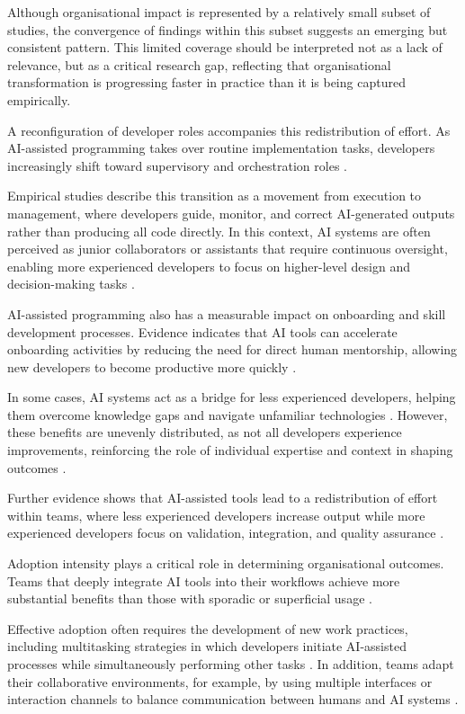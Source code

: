 \documentclass[conference]{IEEEtran}
\begin{document}
Although organisational impact is represented by a relatively small subset of studies, the convergence of findings within this subset suggests an emerging but consistent pattern. This limited coverage should be interpreted not as a lack of relevance, but as a critical research gap, reflecting that organisational transformation is progressing faster in practice than it is being captured empirically.

A reconfiguration of developer roles accompanies this redistribution of effort. As AI-assisted programming takes over routine implementation tasks, developers increasingly shift toward supervisory and orchestration roles \cite{chen_code_2025}.

Empirical studies describe this transition as a movement from execution to management, where developers guide, monitor, and correct AI-generated outputs rather than producing all code directly. In this context, AI systems are often perceived as junior collaborators or assistants that require continuous oversight, enabling more experienced developers to focus on higher-level design and decision-making tasks \cite{weisz_examining_2025}.

AI-assisted programming also has a measurable impact on onboarding and skill development processes. Evidence indicates that AI tools can accelerate onboarding activities by reducing the need for direct human mentorship, allowing new developers to become productive more quickly \cite{vasiliniuc_case_2023}.

In some cases, AI systems act as a bridge for less experienced developers, helping them overcome knowledge gaps and navigate unfamiliar technologies \cite{lyu_will_2025}. However, these benefits are unevenly distributed, as not all developers experience improvements, reinforcing the role of individual expertise and context in shaping outcomes \cite{weisz_examining_2025}.

Further evidence shows that AI-assisted tools lead to a redistribution of effort within teams, where less experienced developers increase output while more experienced developers focus on validation, integration, and quality assurance \cite{koripalli_copilot_2025, kumar_intuition_2025}.

Adoption intensity plays a critical role in determining organisational outcomes. Teams that deeply integrate AI tools into their workflows achieve more substantial benefits than those with sporadic or superficial usage \cite{koripalli_copilot_2025}.

Effective adoption often requires the development of new work practices, including multitasking strategies in which developers initiate AI-assisted processes while simultaneously performing other tasks \cite{chen_code_2025}. In addition, teams adapt their collaborative environments, for example, by using multiple interfaces or interaction channels to balance communication between humans and AI systems \cite{lyu_will_2025}.
\end{document}
